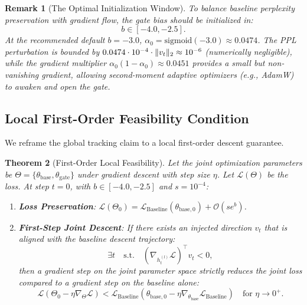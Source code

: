 \documentclass[11pt]{article}
\newtheorem{theorem}{Theorem}[section]
\newtheorem{remark}[theorem]{Remark}
\newcommand{\sigmoid}{\mathrm{sigmoid}}
\DeclarePairedDelimiter{\norm}{\lVert}{\rVert}
\begin{document}
\begin{remark}[The Optimal Initialization Window]
To balance baseline perplexity preservation with gradient flow, the gate bias should be initialized in:
\begin{equation}
b \in [-4.0, -2.5].
\end{equation}
At the recommended default $b = -3.0$, $\alpha_0 = \sigmoid(-3.0) \approx 0.0474$. The PPL perturbation is bounded by $0.0474 \cdot 10^{-4} \cdot \norm{v_t}_2 \approx 10^{-6}$ (numerically negligible), while the gradient multiplier $\alpha_0(1-\alpha_0) \approx 0.0451$ provides a small but non-vanishing gradient, allowing second-moment adaptive optimizers (e.g., AdamW) to awaken and open the gate.
\end{remark}

\subsection{Local First-Order Feasibility Condition}

We reframe the global tracking claim to a local first-order descent guarantee.

\begin{theorem}[First-Order Local Feasibility]
Let the joint optimization parameters be $\Theta = \{\theta_{\text{base}}, \theta_{\text{gate}}\}$ under gradient descent with step size $\eta$. Let $\mathcal{L}(\Theta)$ be the loss. At step $t=0$, with $b \in [-4.0, -2.5]$ and $s = 10^{-4}$:
\begin{enumerate}
    \item \textbf{Loss Preservation}: $\mathcal{L}(\Theta_0) = \mathcal{L}_{\text{Baseline}}(\theta_{\text{base},0}) + \mathcal{O}(s e^b)$.
    \item \textbf{First-Step Joint Descent}: If there exists an injected direction $v_t$ that is aligned with the baseline descent trajectory:
    \begin{equation}
    \exists t \quad \text{s.t.} \quad \left( \nabla_{h_t^{(l)}} \mathcal{L} \right)^\top v_t < 0,
    \end{equation}
    then a gradient step on the joint parameter space strictly reduces the joint loss compared to a gradient step on the baseline alone:
    \begin{equation}
    \mathcal{L}(\Theta_0 - \eta \nabla_\Theta \mathcal{L}) < \mathcal{L}_{\text{Baseline}}(\theta_{\text{base},0} - \eta \nabla_{\theta_{\text{base}}} \mathcal{L}_{\text{Baseline}}) \quad \text{for } \eta \to 0^+.
    \end{equation}
\end{enumerate}
\end{theorem}
\end{document}
